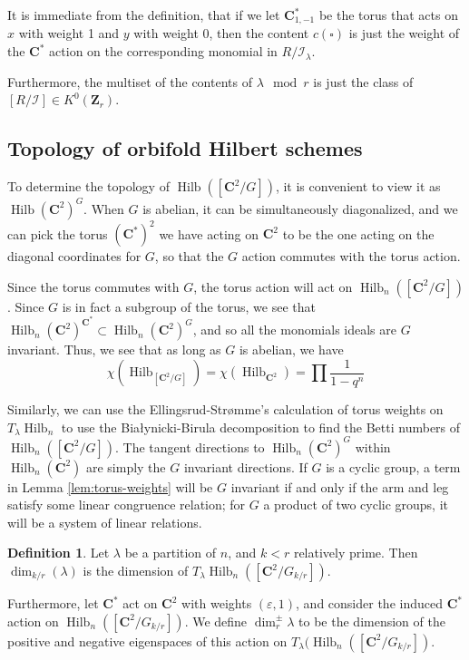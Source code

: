 \documentclass{amsart}[12pt]
\theoremstyle{definition}
\newtheorem{definition}[dummy]{Definition}
\newcommand{\Z}{\mathbf{Z}}
\newcommand{\C}{\mathbf{C}}
\DeclareMathOperator{\Hilb}{Hilb}
\begin{document}
It is immediate from the definition, that if we let $\C^*_{1,-1}$ be the torus that acts on $x$ with weight 1 and $y$ with weight $0$, then the content $c(\square)$ is just the weight of the $\C^*$ action on the corresponding monomial in $R/\mathcal{I}_\lambda$.

Furthermore, the multiset of the contents of $\lambda \mod r$ is just the class of $[R/\mathcal{I}]\in K^0(\Z_r)$.


\subsection{Topology of orbifold Hilbert schemes}

To determine the topology of $\Hilb([\C^2/G])$, it is convenient to view it as $\Hilb(\C^2)^G$.  When $G$ is abelian, it can be simultaneously diagonalized, and we can pick the torus $(\C^*)^2$ we have acting on $\C^2$ to be the one acting on the diagonal coordinates for $G$, so that the $G$ action commutes with the torus action.  

Since the torus commutes with $G$, the torus action will act on $\Hilb_n([\C^2/G])$.  Since $G$ is in fact a subgroup of the torus, we see that $\Hilb_n(\C^2)^{\C^*}\subset\Hilb_n(\C^2)^G$, and so all the monomials ideals are $G$ invariant.  Thus, we see that as long as $G$ is abelian, we have
$$\chi(\Hilb_{[\C^2/G]})=\chi(\Hilb_{\C^2})=\prod\frac{1}{1-q^n}$$

Similarly, we can use the Ellingsrud-Str\o mme's calculation of torus weights on $T_\lambda\Hilb_n$ to use the Bia\l ynicki-Birula decomposition to find the Betti numbers of $\Hilb_n([\C^2/G])$.  The tangent directions to $\Hilb_n(\C^2)^G$ within $\Hilb_n(\C^2)$ are simply the $G$ invariant directions.  If $G$ is a cyclic group, a term in Lemma \ref{lem:torus-weights} will be $G$ invariant if and only if the arm and leg satisfy some linear congruence relation; for $G$ a product of two cyclic groups, it will be a system of linear relations.

\begin{definition}
Let $\lambda$ be a partition of $n$, and $k<r$ relatively prime.  Then $\dim_{k/r}(\lambda)$ is the dimension of $T_\lambda\Hilb_n([\C^2/G_{k/r}])$.

Furthermore, let $\C^*$ act on $\C^2$ with weights $(\varepsilon, 1)$, and consider the induced $\C^*$ action on $\Hilb_n([\C^2/G_{k/r}])$.  We define $\dim^{\pm}_r \lambda$ to be the dimension of the positive and negative eigenspaces of this action on $T_\lambda(\Hilb_n([\C^2/G_{k/r}])$. 
\end{definition}
\end{document}
